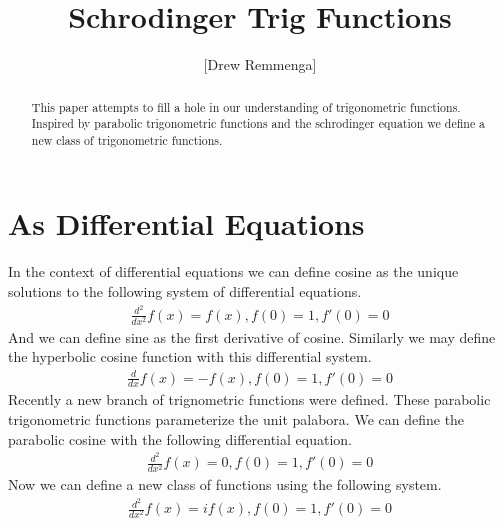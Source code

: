 \documentclass[10pt, oneside]{article}
\title{Schrodinger Trig Functions}
\author{[Drew Remmenga]}
\begin{document}
\maketitle
\begin{abstract}
    This paper attempts to fill a hole in our understanding of trigonometric functions. Inspired by parabolic trigonometric functions and the schrodinger equation we define a new class of trigonometric functions. 
\end{abstract}
\section{As Differential Equations}
    In the context of differential equations we can define cosine as the unique solutions to the following system of differential equations. \cite{bartle1999introduction}
    \begin{align}
        \frac{d^2}{dx^2} f(x) = f(x), f(0) = 1, f'(0) = 0 \label{eq:1}
    \end{align}
    And we can define sine as the first derivative of cosine. 
    Similarly we may define the hyperbolic cosine function with this differential system. \cite{bartle1999introduction}
    \begin{align}
        \frac{d}{dx} f(x) = -f(x), f(0) = 1, f'(0) = 0 \label{eq:2}
    \end{align}
    Recently a new branch of trignometric functions were defined. These parabolic trigonometric functions parameterize the unit palabora. \cite{dattoli2011parabolictrigonometricfunctions} We can define the parabolic cosine with the following differential equation. 
    \begin{align}
        \frac{d^2}{dx^2} f(x) = 0, f(0) = 1, f'(0) = 0 \label{eq:3}
    \end{align}
    Now we can define a new class of functions using the following system.
    \begin{align}
        \frac{d^2}{dx^2} f(x) = i f(x), f(0) = 1, f'(0) = 0 \label{eq:4}
    \end{align}
\end{document}
